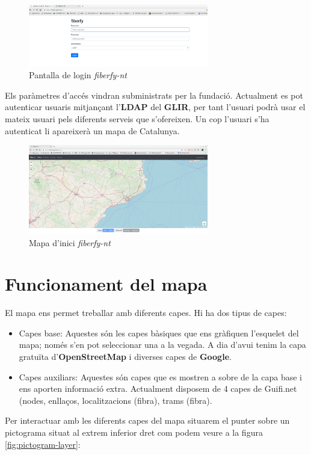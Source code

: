 \documentclass[a4paper]{article}
\begin{document}
	\begin{figure}[H]
		\centering
		\includegraphics[width=0.7\textwidth]{images/login_screen.png}
		\caption{Pantalla de login \emph{fiberfy-nt}}
	\end{figure}

	Els paràmetres d'accés vindran subministrats per la fundació. Actualment es pot autenticar usuaris mitjançant l'\textbf{LDAP} del \textbf{GLIR}, per tant l'usuari podrà usar el mateix usuari pels diferents serveis que s'ofereixen. Un cop l'usuari s'ha autenticat li apareixerà un mapa de Catalunya.
	
	\begin{figure}[H]
		\centering
		\includegraphics[width=0.7\textwidth]{images/map_screen.png}
		\caption{Mapa d'inici \emph{fiberfy-nt}}
	\end{figure}

	\section{Funcionament del mapa}
	El mapa ens permet treballar amb diferents capes. Hi ha dos tipus de capes:
	\begin{itemize}
		\item Capes base: Aquestes són les capes bàsiques que ens gràfiquen l'esquelet del mapa; només s'en pot seleccionar una a la vegada. A dia d'avui tenim la capa gratuïta d'\textbf{OpenStreetMap} i diverses capes de \textbf{Google}.
		\item Capes auxiliars: Aquestes són capes que es mostren a sobre de la capa base i ens aporten informació extra. Actualment disposem de 4 capes de Guifi.net (nodes, enllaços, localitzacions (fibra), trams (fibra).
	\end{itemize}
	Per interactuar amb les diferents capes del mapa situarem el punter sobre un pictograma situat al extrem inferior dret com podem veure a la figura \ref{fig:pictogram-layer}:
	
\end{document}
